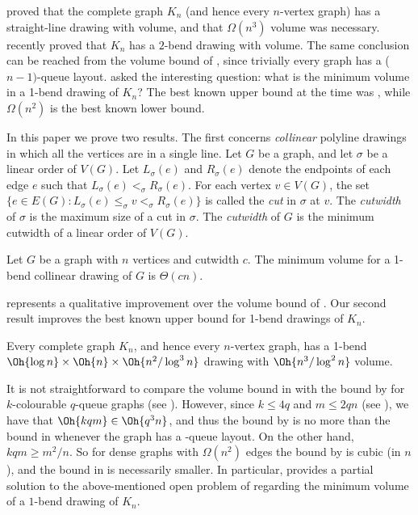 \documentclass[10pt,twocolumn]{article}
\begin{document}
\citet{CELR-Algo96} proved that the complete graph $K_n$ (and hence every
$n$-vertex graph) has a straight-line drawing with  volume, and that
$\Omega(n^3)$ volume was necessary. \citet{Wismath-TR04} recently proved that
$K_n$ has a $2$-bend drawing with  volume. The same conclusion can be
reached from the  volume bound of \citet{DujWoo-Subdivisions}, since
trivially every graph has a ($n-1)$-queue layout. \citet{Wismath-TR04} asked
the interesting question: what is the minimum volume in a 1-bend drawing of
$K_n$? The best known upper bound at the time was , while $\Omega(n^2)$
is the best known lower bound. 

In this paper we prove two results.  The first concerns \emph{collinear}
polyline drawings in which all the vertices are in a single line.  Let $G$ be a
graph, and let $\sigma$ be a linear order of $V(G)$.  Let $L_\sigma(e)$ and
$R_\sigma(e)$ denote the endpoints of each edge $e$ such that
$L_\sigma(e)<_\sigma R_\sigma(e)$. For each vertex $v\in V(G)$, the set $\{e\in
E(G):L_\sigma(e)\leq_\sigma v<_\sigma R_\sigma(e)\}$ is called the \emph{cut}
in $\sigma$ at $v$. The \emph{cutwidth} of $\sigma$ is the maximum size of a
cut in $\sigma$. The \emph{cutwidth} of $G$ is the minimum cutwidth of a linear
order of $V(G)$.  

\begin{theorem}
Let $G$ be a graph with $n$ vertices and cutwidth $c$.  The minimum volume for
a 1-bend collinear drawing of $G$ is $\Theta(cn)$.
\end{theorem}

 represents a qualitative improvement over the
 volume bound of \citet{DujWoo-Subdivisions}. Our second result improves
the best known upper bound for 1-bend drawings of $K_n$. 

\begin{theorem}
Every complete graph $K_n$, and hence every $n$-vertex graph, has a 1-bend
$\Oh{\log n}\times\Oh{n}\times\Oh{n^2/\log^3n}$ drawing with $\Oh{n^3/\log^2 n}$
volume.
\end{theorem}

It is not straightforward to compare the volume bound in  with the
 bound by \citet{DujWoo-Subdivisions} for $k$-colourable $q$-queue
graphs (see ). However, since $k\leq 4q$ and $m\leq
2qn$ (see \citep{DujWoo-LinearLayouts}), we have that $\Oh{kqm} \in \Oh{q^3n}$,
and thus the  bound by \citet{DujWoo-Subdivisions} is no more than the 
bound in  whenever the graph has a -queue
layout. On the other hand, $kqm\geq m^2/n$. So for dense graphs with
$\Omega(n^2)$ edges the  bound  by \citet{DujWoo-Subdivisions} is cubic
(in $n$), and the bound in  is necessarily smaller. In particular,
 provides a partial solution to the above-mentioned open problem
of \citet{Wismath-TR04} regarding the minimum volume of a $1$-bend drawing of
$K_n$.
\end{document}
